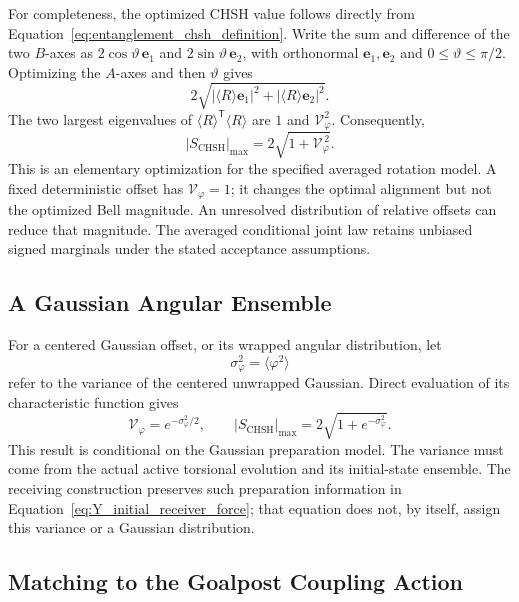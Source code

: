 For completeness, the optimized CHSH value follows directly from Equation~\eqref{eq:entanglement_chsh_definition}. Write the sum and difference of the two $B$-axes as $2\cos\vartheta\,\mathbf e_1$ and $2\sin\vartheta\,\mathbf e_2$, with orthonormal $\mathbf e_1,\mathbf e_2$ and $0\leq\vartheta\leq\pi/2$. Optimizing the $A$-axes and then $\vartheta$ gives
\begin{equation}
    2\sqrt{
      |\langle R\rangle\mathbf e_1|^2
      +|\langle R\rangle\mathbf e_2|^2
    }.
\end{equation}
The two largest eigenvalues of $\langle R\rangle^{\mathsf T}\langle R\rangle$ are $1$ and $\mathcal V_\varphi^2$. Consequently,
\begin{equation}
    \boxed{
    |S_{\mathrm{CHSH}}|_{\max}
    =2\sqrt{1+\mathcal V_\varphi^{\,2}}
    }.
\end{equation}
This is an elementary optimization for the specified averaged rotation model. A fixed deterministic offset has $\mathcal V_\varphi=1$; it changes the optimal alignment but not the optimized Bell magnitude. An unresolved distribution of relative offsets can reduce that magnitude. The averaged conditional joint law retains unbiased signed marginals under the stated acceptance assumptions.

\subsection{A Gaussian Angular Ensemble}

For a centered Gaussian offset, or its wrapped angular distribution, let
\begin{equation}
    \sigma_\varphi^2=\langle\varphi^2\rangle
\end{equation}
refer to the variance of the centered unwrapped Gaussian. Direct evaluation of its characteristic function gives
\begin{equation}
    \mathcal V_\varphi=e^{-\sigma_\varphi^2/2},
    \qquad
    \boxed{
    |S_{\mathrm{CHSH}}|_{\max}
    =2\sqrt{1+e^{-\sigma_\varphi^2}}
    }.
\end{equation}
This result is conditional on the Gaussian preparation model. The variance must come from the actual active torsional evolution and its initial-state ensemble. The receiving construction preserves such preparation information in Equation~\eqref{eq:Y_initial_receiver_force}; that equation does not, by itself, assign this variance or a Gaussian distribution.

\subsection{Matching to the Goalpost Coupling Action}

